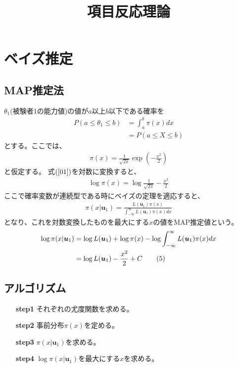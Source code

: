 \documentclass[12pt]{jarticle}
\title{項目反応理論}
\begin{document}
\maketitle
\section{ベイズ推定}
\subsection{MAP推定法}
$\theta_1$(被験者$1$の能力値)の値が$a$以上$b$以下である確率を
\begin{align*}
  \label{00}
  \displaystyle P(a \leq \theta_1 \leq b) &= \int_{a}^{b} \pi(x) dx \\ &= P(a \leq X \leq b)
  \tag{1}
\end{align*}
とする。ここでは、
\begin{align*}
  \label{01}
  \displaystyle \pi(x) = \frac{1}{\sqrt{2\pi}}\exp\left(- \frac{x^2}{2}\right)
  \tag{2}
\end{align*}と仮定する。
式$(\ref{01})$を対数に変換すると、
\begin{align}
  \label{02}
  \displaystyle \log \pi(x) = \log\frac{1}{\sqrt{2\pi}} - \frac{x^2}{2} \tag{3}
\end{align}
ここで確率変数が連続型である時にベイズの定理を適応すると、
\begin{align}
  \label{03}
  \displaystyle \pi(x|\boldsymbol{u}_1) = \frac{L(\boldsymbol{u}_1)\pi(x)}{\int_{-\infty}^{\infty}L(\boldsymbol{u}_1)\pi(x)dx}
  \tag{4}
\end{align}となり、これを対数変換したものを最大にする$x$の値をMAP推定値という。
\begin{align}
  \label{04}
  \displaystyle  \log \pi(x|\boldsymbol{u}_1) &= \log L(\boldsymbol{u}_1) + \log \pi(x) - \log\int_{-\infty}^{\infty}L(\boldsymbol{u}_1)\pi(x)dx \notag\\
  &= \log L(\boldsymbol{u}_1) -\frac{x^2}{2} + C
  \tag{5}
\end{align}
\subsection{アルゴリズム}
\begin{itemize}
  \item[\textbf{step1}] それぞれの尤度関数を求める。
  \item[\textbf{step2}] 事前分布$\pi(x)$を定める。
  \item[\textbf{step3}] $\pi(x|\boldsymbol{u}_1)$を求める。
  \item[\textbf{step4}] $\log\pi(x|\boldsymbol{u}_1)$を最大にする$x$を求める。
\end{itemize}
\end{document}

